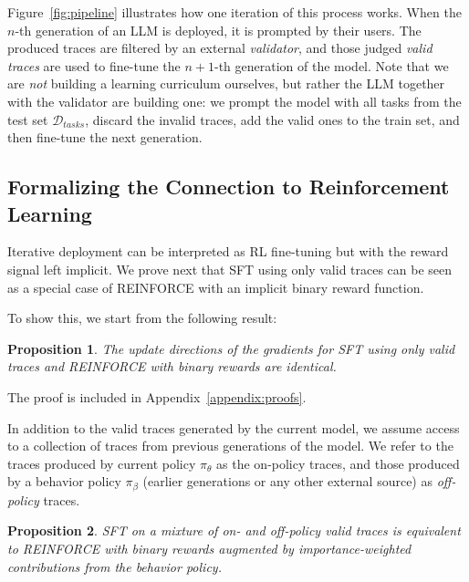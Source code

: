 \documentclass{article}
\newtheorem{proposition}{Proposition}
\renewcommand{\cite}[1]{\citep[][]{#1}}
\begin{document}
Figure~\ref{fig:pipeline} illustrates how one iteration of this process
works. When the $n$-th generation of an LLM is deployed, it is prompted by their users. The produced traces are
filtered by an external \emph{validator}, and those judged \emph{valid traces}
are used to fine-tune the $n+1$-th generation of the model.
Note that we are \emph{not} building a learning curriculum ourselves, but rather the LLM together with the validator are building one: we prompt the model with all tasks from the test set $\mathcal{D}_{tasks}$, discard the invalid traces, add the valid ones to the train set, and then fine-tune the next generation.



\subsection{Formalizing the Connection to Reinforcement Learning}
\label{sec:rl}

Iterative deployment can be interpreted as RL fine-tuning but with the reward
signal left implicit. We prove next that SFT using only valid traces can be seen
as a special case of REINFORCE \cite{williams-jml1992} with an implicit binary reward function.

To show this, we start from the following result:

\begin{proposition}
The update directions of the gradients for SFT using only
valid traces and REINFORCE with binary rewards are identical.
\label{thm:gradient-direction}
\end{proposition}

The proof is included in Appendix~\ref{appendix:proofs}.

In addition to the valid traces generated by the current model, we assume access
to a collection of traces from previous generations of the model. We refer to
the traces produced by current policy $\pi_\theta$ as the on-policy traces, and
those produced by a behavior policy $\pi_\beta$ (earlier generations or any
other external source) as \emph{off-policy} traces.

\begin{proposition}
SFT on a mixture of on- and off-policy valid traces is equivalent to REINFORCE
with binary rewards augmented by importance-weighted contributions from the
behavior policy.
\label{thm:importance-weighted}
\end{proposition}
\end{document}
